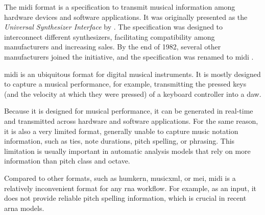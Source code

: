 


The \gls{midi} format is a specification to transmit musical
information among hardware devices and software
applications. It was originally presented as the
\emph{Universal Synthesizer Interface} by
\textcite{smith1981usi}. The specification was designed to
interconnect different synthesizers, facilitating
compatibility among manufacturers and increasing sales. By
the end of 1982, several other manufacturers joined the
initiative, and the specification was renamed to \gls{midi}
\parencite{moog1986midi}.


\gls{midi} is an ubiquitous format for digital musical
instruments. It is mostly designed to capture a musical
performance, for example, transmitting the pressed keys (and
the velocity at which they were pressed) of a keyboard
controller into a \gls{daw}.

Because it is designed for musical performance, it can be
generated in real-time and transmitted across hardware and
software applications. For the same reason, it is also a
very limited format, generally unable to capture music
notation information, such as ties, note durations, pitch
spelling, or phrasing. This limitation is usually important
in automatic analysis models that rely on more information
than pitch class and octave.



Compared to other formats, such as \gls{humkern},
\gls{musicxml}, or \gls{mei}, \gls{midi} is a relatively
inconvenient format for any \gls{rna} workflow. For example,
as an input, it does not provide reliable pitch spelling
information, which is crucial in recent \gls{arna} models.
